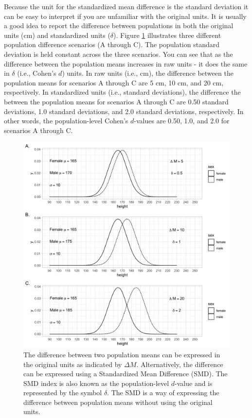 \documentclass[
]{krantz}
\begin{document}
Because the unit for the standardized mean difference is the standard deviation it can be easy to interpret if you are unfamiliar with the original units. It is usually a good idea to report the difference between populations in both the original units (cm) and standardized units (\(\delta\)). Figure \ref{fig:dex1} illustrates three different population difference scenarios (A through C). The population standard deviation is held constant across the three scenarios. You can see that as the difference between the population means increases in raw units - it does the same in \(\delta\) (i.e., Cohen's \(d\)) units. In raw units (i.e., cm), the difference between the population means for scenarios A through C are 5 cm, 10 cm, and 20 cm, respectively. In standardized units (i.e., standard deviations), the difference the between the population means for scenarios A through C are 0.50 standard deviations, 1.0 standard deviations, and 2.0 standard deviations, respectively. In other words, the population-level Cohen's \(d\)-values are 0.50, 1.0, and 2.0 for scenarios A through C.

\begin{figure}
\includegraphics[width=1\linewidth]{ch_populations/images/dvalue_ex1} \caption[Illustrating standardized mean difference]{The difference between two population means can be expressed in the original units as indicated by $\Delta M$. Alternatively, the difference can be expressed using a Standardized Mean Difference (SMD). The SMD index is also known as the population-level $d$-value and is represented by the symbol $\delta$. The SMD is a way of expressing the difference between population means without using the original units. }\label{fig:dex1}
\end{figure}
\end{document}
